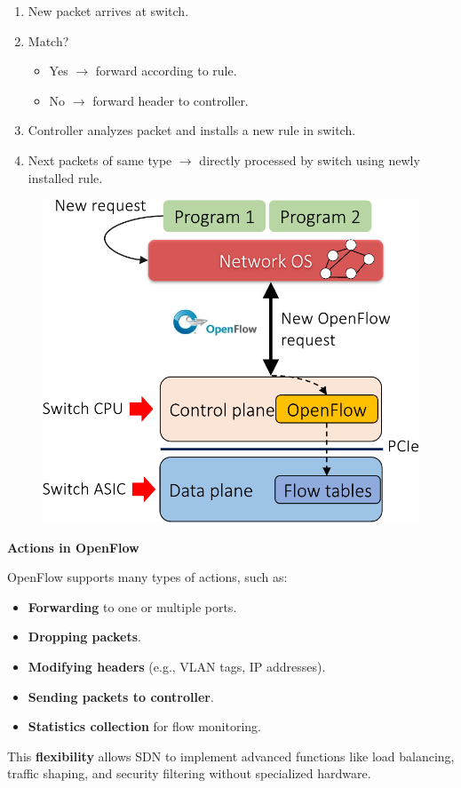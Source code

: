 \highspace
\begin{examplebox}[: OpenFlow]
    \begin{enumerate}
        \item New packet arrives at switch.
        \item Match?
        \begin{itemize}
            \item Yes $\rightarrow$ forward according to rule.
            \item No $\rightarrow$ forward header to controller.
        \end{itemize}
        \item Controller analyzes packet and installs a new rule in switch.
        \item Next packets of same type $\rightarrow$ directly processed by switch using newly installed rule.
    \end{enumerate}
\end{examplebox}

\begin{figure}[!htp]
    \centering
    \includegraphics[width=.6\textwidth]{img/openflow.pdf}
\end{figure}

\highspace
\begin{flushleft}
    \textcolor{Green3}{ \textbf{Actions in OpenFlow}}
\end{flushleft}
OpenFlow supports many types of actions, such as:
\begin{itemize}
    \item \textbf{Forwarding} to one or multiple ports.
    \item \textbf{Dropping packets}.
    \item \textbf{Modifying headers} (e.g., VLAN tags, IP addresses).
    \item \textbf{Sending packets to controller}.
    \item \textbf{Statistics collection} for flow monitoring.
\end{itemize}
This \textbf{flexibility} allows SDN to implement advanced functions like load balancing, traffic shaping, and security filtering without specialized hardware.

